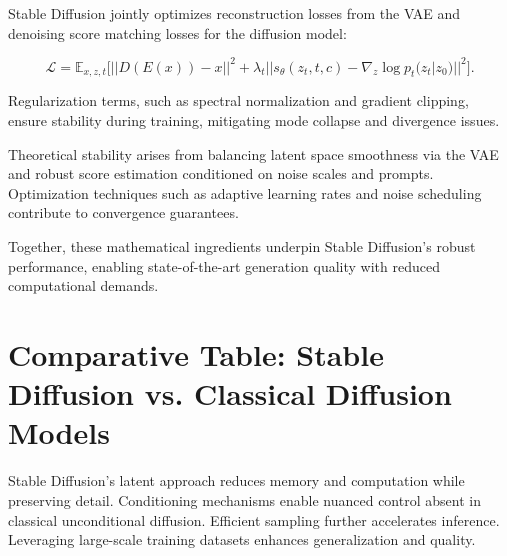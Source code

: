 Stable Diffusion jointly optimizes reconstruction losses from the VAE and denoising score matching losses for the diffusion model:

\[
\mathcal{L} = \mathbb{E}_{x,z,t} \big[ || D(E(x)) - x ||^2 + \lambda_t || s_\theta(z_t, t, c) - \nabla_z \log p_t(z_t | z_0) ||^2 \big].
\]

Regularization terms, such as spectral normalization and gradient clipping, ensure stability during training, mitigating mode collapse and divergence issues.

Theoretical stability arises from balancing latent space smoothness via the VAE and robust score estimation conditioned on noise scales and prompts. Optimization techniques such as adaptive learning rates and noise scheduling contribute to convergence guarantees.

Together, these mathematical ingredients underpin Stable Diffusion’s robust performance, enabling state-of-the-art generation quality with reduced computational demands.

\section{Comparative Table: Stable Diffusion vs. Classical Diffusion Models}

\begin{table}[h]
\centering
{}
\caption{Comparative Analysis of Stable Diffusion vs. Classical Diffusion Models}
\end{table}

Stable Diffusion’s latent approach reduces memory and computation while preserving detail. Conditioning mechanisms enable nuanced control absent in classical unconditional diffusion. Efficient sampling further accelerates inference. Leveraging large-scale training datasets enhances generalization and quality.

